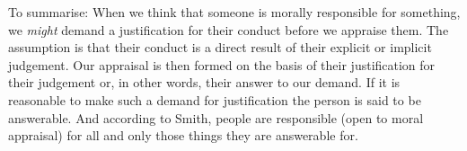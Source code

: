\documentclass{article}
\begin{document}

 To summarise:
 When we think that someone is morally responsible for something, we
 \textit{might} demand a justification for their conduct before we
 appraise them. The assumption is that their conduct is a direct result of their
 explicit or implicit judgement. Our appraisal is then formed on the basis of
 their justification for their judgement or, in other words, their answer to our
 demand. If it is reasonable to make such a demand for justification the person
 is said to be answerable. And according to Smith, people are responsible (open
 to moral appraisal) for all and only those things they are answerable for.

%
%
%
%
%
%
%
%
\end{document}
